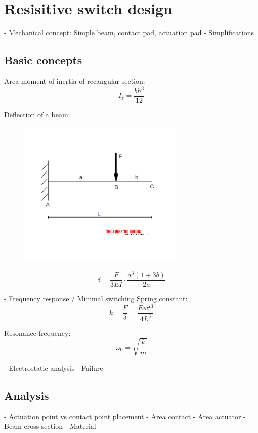 \section{Resisitive switch design}
\label{sec:resisitive_switch_design}
- Mechanical concept: Simple beam, contact pad, actuation pad
- Simplifications

\subsection{Basic concepts}
\label{sec:basic_concepts}
Area moment of inertia of recangular section:
\begin{equation}
	I_z = \frac{bh^3}{12}
	\label{eq:area_moment_of_inertia}
\end{equation}

Deflection of a beam:
\begin{figure}[h]
	\centering
	\includegraphics[width=8cm]{fig/cantilever_beam_single_load.png}
	\label{fig:cantilever_beam_single_load}
\end{figure}

\begin{equation}
	\delta = \frac{F}{3EI}\cdot\frac{a^3(1+3b)}{2a}
	\label{eq:beam_deflection}
\end{equation}

- Frequency response / Minimal switching
Spring constant:
\begin{equation}
	k = \frac{F}{\delta} = \frac{Ewt^3}{4L^3}
	\label{eq:spring_constant}
\end{equation}

Resonance frequency:
\begin{equation}
	\omega_0 = \sqrt{\frac{k}{m}}
	\label{eq:resonance_frequency}
\end{equation}


- Electrostatic analysis
- Failure

\subsection{Analysis}
\label{sec:analysis}
- Actuation point vs contact point placement
- Area contact
- Area actuator
- Beam cross section
- Material
